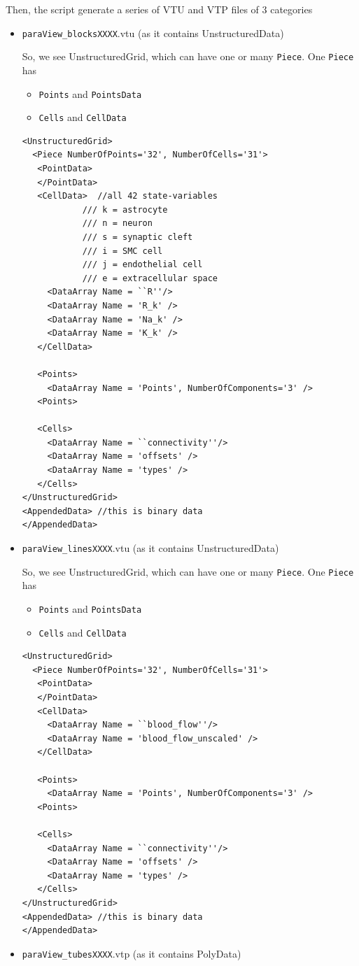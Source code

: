 Then, the script generate a series of VTU and VTP files of 3 categories
\begin{itemize}
  \item \verb!paraView_blocksXXXX!.vtu (as it contains UnstructuredData)

So, we see UnstructuredGrid, which can have one or many \verb!Piece!. 
One \verb!Piece! has 
\begin{itemize}
  \item \verb!Points! and \verb!PointsData!
  \item \verb!Cells! and \verb!CellData!
\end{itemize}

{\tiny 
\begin{verbatim}
<UnstructuredGrid>
  <Piece NumberOfPoints='32', NumberOfCells='31'>
   <PointData>
   </PointData>
   <CellData>  //all 42 state-variables
            /// k = astrocyte
            /// n = neuron
            /// s = synaptic cleft
            /// i = SMC cell
            /// j = endothelial cell
            /// e = extracellular space
     <DataArray Name = ``R''/>
     <DataArray Name = 'R_k' />
     <DataArray Name = 'Na_k' />
     <DataArray Name = 'K_k' />
   </CellData>

   <Points>
     <DataArray Name = 'Points', NumberOfComponents='3' />
   <Points>

   <Cells>
     <DataArray Name = ``connectivity''/>
     <DataArray Name = 'offsets' />
     <DataArray Name = 'types' />
   </Cells>
</UnstructuredGrid>
<AppendedData> //this is binary data
</AppendedData>
\end{verbatim}
}  
  
  \item \verb!paraView_linesXXXX!.vtu  (as it contains UnstructuredData)

So, we see UnstructuredGrid, which can have one or many \verb!Piece!. 
One \verb!Piece! has 
\begin{itemize}
  \item \verb!Points! and \verb!PointsData!
  \item \verb!Cells! and \verb!CellData!
\end{itemize}
  
{\tiny 
\begin{verbatim}
<UnstructuredGrid>
  <Piece NumberOfPoints='32', NumberOfCells='31'>
   <PointData>
   </PointData>
   <CellData>
     <DataArray Name = ``blood_flow''/>
     <DataArray Name = 'blood_flow_unscaled' />
   </CellData>

   <Points>
     <DataArray Name = 'Points', NumberOfComponents='3' />
   <Points>

   <Cells>
     <DataArray Name = ``connectivity''/>
     <DataArray Name = 'offsets' />
     <DataArray Name = 'types' />
   </Cells>
</UnstructuredGrid>
<AppendedData> //this is binary data
</AppendedData>
\end{verbatim}
}  
  
  \item \verb!paraView_tubesXXXX!.vtp (as it contains PolyData)
\end{itemize}



